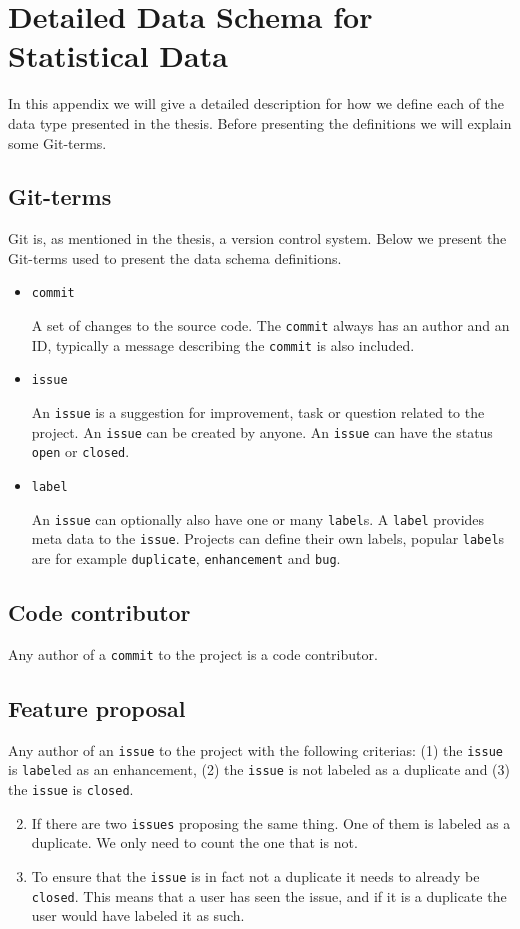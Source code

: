 \section{Detailed Data Schema for Statistical Data}
\label{ap:detailed_data}
In this appendix we will give a detailed description for how we define each of the data type presented in the thesis. Before presenting the definitions we will explain some Git-terms.

\subsection*{Git-terms}
Git is, as mentioned in the thesis, a version control system. Below we present the Git-terms used to present the data schema definitions.

\begin{itemize}
	\item\texttt{commit}

	A set of changes to the source code. The \texttt{commit} always has an author and an ID, typically a message describing the \texttt{commit} is also included.
	\item\texttt{issue}

	An \texttt{issue} is a suggestion for improvement, task or question related to the project. An \texttt{issue} can be created by anyone. An \texttt{issue} can have the status \texttt{open} or \texttt{closed}.

	\item\texttt{label}

	An \texttt{issue} can optionally also have one or many \texttt{label}s. A \texttt{label} provides meta data to the \texttt{issue}. Projects can define their own labels, popular \texttt{label}s are for example \texttt{duplicate}, \texttt{enhancement} and \texttt{bug}.
\end{itemize}

\subsection*{Code contributor}
Any author of a \texttt{commit} to the project is a code contributor.
\subsection*{Feature proposal}
Any author of an \texttt{issue} to the project with the following criterias: (1) the \texttt{issue} is \texttt{label}ed as an enhancement, (2) the \texttt{issue} is not labeled as a duplicate and (3) the \texttt{issue} is \texttt{closed}.
\begin{enumerate}
	\setcounter{enumi}{1}
	\item If there are two \texttt{issues} proposing the same thing. One of them is labeled as a duplicate. We only need to count the one that is not.
	\item To ensure that the \texttt{issue} is in fact not a duplicate it needs to already be \texttt{closed}. This means that a user has seen the issue, and if it is a duplicate the user would have labeled it as such.
\end{enumerate}
